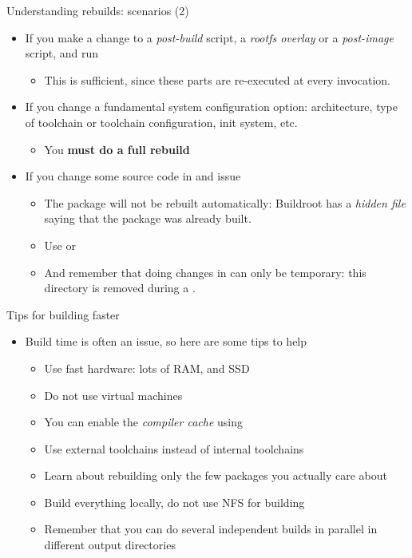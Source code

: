 \begin{frame}{Understanding rebuilds: scenarios (2)}
  \begin{itemize}
  \item If you make a change to a {\em post-build} script, a {\em
      rootfs overlay} or a {\em post-image} script, and run
    \begin{itemize}
    \item This is sufficient, since these parts are re-executed at
      every  invocation.
    \end{itemize}
  \item If you change a fundamental system configuration option:
    architecture, type of toolchain or toolchain configuration, init
    system, etc.
    \begin{itemize}
    \item You {\bf must do a full rebuild}
    \end{itemize}
  \item If you change some source code in
     and issue 
    \begin{itemize}
    \item The package will not be rebuilt automatically: Buildroot has
      a {\em hidden file} saying that the package was already built.
    \item Use  or 
    \item And remember that doing changes in
       can only be temporary: this
      directory is removed during a .
    \end{itemize}
  \end{itemize}
\end{frame}

\begin{frame}{Tips for building faster}
  \begin{itemize}
  \item Build time is often an issue, so here are some tips to help
    \begin{itemize}
    \item Use fast hardware: lots of RAM, and SSD
    \item Do not use virtual machines
    \item You can enable the  {\em compiler cache} using
    \item Use external toolchains instead of internal toolchains
    \item Learn about rebuilding only the few packages you actually
      care about
    \item Build everything locally, do not use NFS for building
    \item Remember that you can do several independent builds in
      parallel in different output directories
    \end{itemize}
  \end{itemize}
\end{frame}

